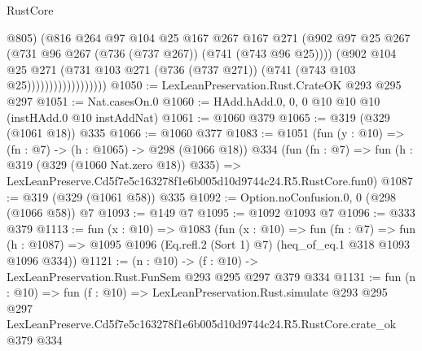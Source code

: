 \begin{lexlean}{RustCore}
\begin{coremodule}
                                @805)
                              (@816
                                @264
                                @97
                                @104
                                @25
                                @167
                                @267
                                @167
                                @271
                                (@902
                                  @97
                                  @25
                                  @267
                                  (@731 @96 @267 (@736 (@737 @267)) (@741 (@743 @96 @25))))
                                (@902
                                  @104
                                  @25
                                  @271
                                  (@731
                                    @103
                                    @271
                                    (@736 (@737 @271))
                                    (@741 (@743 @103 @25))))))))))))))))))
@1050 := LexLeanPreservation.Rust.CrateOK @293 @295 @297
@1051 := Nat.casesOn.{0}
@1060 := HAdd.hAdd.{0, 0, 0} @10 @10 @10 (instHAdd.{0} @10 instAddNat)
@1061 := @1060 @379
@1065 := @319 (@329 (@1061 @18)) @335
@1066 := @1060 @377
@1083 := @1051
    (fun (y : @10) => (fn : @7) -> (h : @1065) -> @298 (@1066 @18))
    @334
    (fun (fn : @7) =>
    fun (h : @319 (@329 (@1060 Nat.zero @18)) @335) =>
    LexLeanPreserve.Cd5f7e5c163278f1e6b005d10d9744c24.R5.RustCore.fun0)
@1087 := @319 (@329 (@1061 @58)) @335
@1092 := Option.noConfusion.{0, 0} (@298 (@1066 @58)) @7
@1093 := @149 @7
@1095 := @1092 @1093 @7
@1096 := @333 @379
@1113 := fun (x : @10) =>
  @1083
    (fun (x : @10) =>
    fun (fn : @7) =>
    fun (h : @1087) => @1095 @1096 (Eq.refl.{2} (Sort 1) @7) (heq_of_eq.{1} @318 @1093 @1096 @334))
@1121 := (n : @10) -> (f : @10) -> LexLeanPreservation.Rust.FunSem @293 @295 @297 @379 @334
@1131 := fun (n : @10) =>
  fun (f : @10) =>
  LexLeanPreservation.Rust.simulate
    @293
    @295
    @297
    LexLeanPreserve.Cd5f7e5c163278f1e6b005d10d9744c24.R5.RustCore.crate_ok
    @379
    @334
\end{coremodule}
\end{lexlean}
